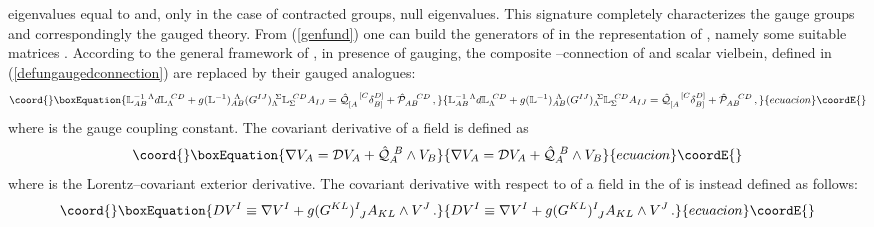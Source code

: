 \documentclass[a4paper,12pt]{article}
\begin{document}
 \coordHE{} eigenvalues equal to \coordHE{}   and, only in the case of contracted groups,
  \coordHE{}  null eigenvalues. This signature completely characterizes
the gauge groups and correspondingly the
gauged theory.
From (\ref{genfund}) one can build the generators of
\coordHE{} in the
\coordHE{} representation of \coordHE{}, namely
some suitable matrices \coordHE{}.
According to the general framework of
\cite{mylecture,castdauriafre,noi4D}, in presence of gauging,
the composite \coordHE{}--connection of \coordHE{} and scalar vielbein,
defined in (\ref{defungaugedconnection}) are replaced by their gauged analogues:
\begin{equation}\coord{}\boxEquation{
\mathbb{L}^{-1~\Lambda}_{AB}d\mathbb{L}_{\Lambda}^{~CD}+
g(\mathbb{L}^{-1})_{AB}^{~\Lambda}(G^{IJ})_{\Lambda}^{~\Sigma}\mathbb{L}_{\Sigma}^{~CD}
A_{IJ}=\hat{\mathcal{Q}}_{[A}^{~~~[C}\delta^{D]}_{B]}+\hat{\mathcal{P}}_{AB}^{~~~CD}\,,
\label{defgaugedconnection}
}{
\mathbb{L}^{-1~\Lambda}_{AB}d\mathbb{L}_{\Lambda}^{~CD}+
g(\mathbb{L}^{-1})_{AB}^{~\Lambda}(G^{IJ})_{\Lambda}^{~\Sigma}\mathbb{L}_{\Sigma}^{~CD}
A_{IJ}=\hat{\mathcal{Q}}_{[A}^{~~~[C}\delta^{D]}_{B]}+\hat{\mathcal{P}}_{AB}^{~~~CD}\,,
}{ecuacion}\coordE{}\end{equation}
where \coordHE{} is the gauge coupling constant.
The covariant \coordHE{} derivative of a field \coordHE{}
is defined as
\begin{equation}\coord{}\boxEquation{
\nabla V_A=\mathcal{D} V_A+\hat{\mathcal{Q}}_A^{~B}\wedge V_B
\label{covQder}
}{
\nabla V_A=\mathcal{D} V_A+\hat{\mathcal{Q}}_A^{~B}\wedge V_B
}{ecuacion}\coordE{}\end{equation}
where \coordHE{} is the Lorentz--covariant exterior derivative.
The covariant derivative with respect to \coordHE{}
of a field \coordHE{} in the \coordHE{} of \coordHE{} is instead defined as
follows:
\begin{equation}\coord{}\boxEquation{
DV^I\equiv \nabla V^I+g(G^{KL})^I_{~J}A_{KL}\wedge V^J\,.
\label{covGder}
}{
DV^I\equiv \nabla V^I+g(G^{KL})^I_{~J}A_{KL}\wedge V^J\,.
}{ecuacion}\coordE{}\end{equation}
\end{document}
